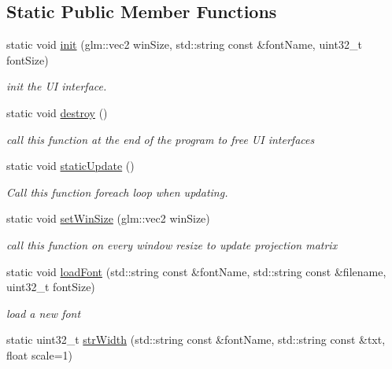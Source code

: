 \subsection*{Static Public Member Functions}
\begin{DoxyCompactItemize}
\item 
static void \hyperlink{class_a_base_u_i_a6ddd4c5f9808ccf2c76dc1b22f482a09}{init} (glm\+::vec2 win\+Size, std\+::string const \&font\+Name, uint32\+\_\+t font\+Size)
\begin{DoxyCompactList}\small\item\em init the UI interface. \end{DoxyCompactList}\item 
\mbox{\label{class_a_base_u_i_aff73dc314c8cbb5764c27462f0e5e887}} 
static void \hyperlink{class_a_base_u_i_aff73dc314c8cbb5764c27462f0e5e887}{destroy} ()
\begin{DoxyCompactList}\small\item\em call this function at the end of the program to free UI interfaces \end{DoxyCompactList}\item 
\mbox{\label{class_a_base_u_i_a71134720c986e99b086a257eef3959ed}} 
static void \hyperlink{class_a_base_u_i_a71134720c986e99b086a257eef3959ed}{static\+Update} ()
\begin{DoxyCompactList}\small\item\em Call this function foreach loop when updating. \end{DoxyCompactList}\item 
static void \hyperlink{class_a_base_u_i_a7d1d35a35a1676cc00ffa0b63c0b8a7f}{set\+Win\+Size} (glm\+::vec2 win\+Size)
\begin{DoxyCompactList}\small\item\em call this function on every window resize to update projection matrix \end{DoxyCompactList}\item 
static void \hyperlink{class_a_base_u_i_a0f874aa68f35600ea0a5396aedcb73a0}{load\+Font} (std\+::string const \&font\+Name, std\+::string const \&filename, uint32\+\_\+t font\+Size)
\begin{DoxyCompactList}\small\item\em load a new font \end{DoxyCompactList}\item 
static uint32\+\_\+t \hyperlink{class_a_base_u_i_a6ed4ed464a3e8992d37c5eb2a386c052}{str\+Width} (std\+::string const \&font\+Name, std\+::string const \&txt, float scale=1)

\end{DoxyCompactItemize}
